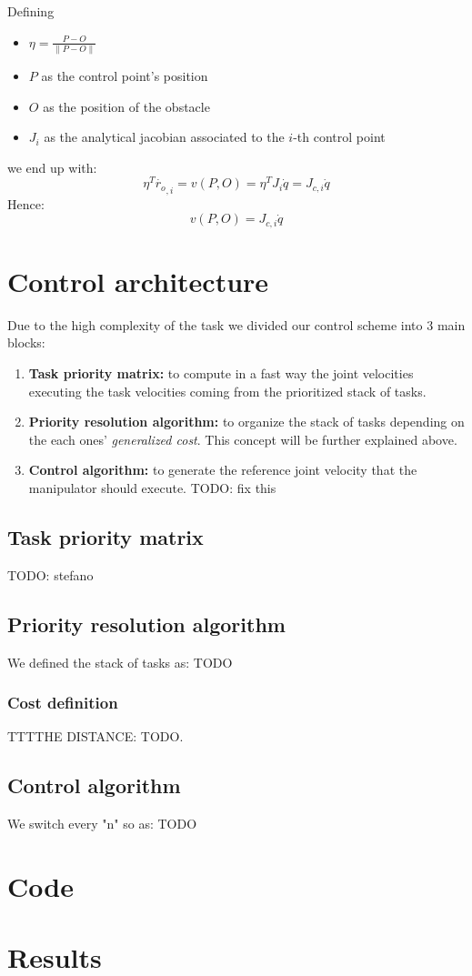 \documentclass[12pt,a4paper, twocolumn, twoside]{article}
\begin{document}
Defining 
\begin{itemize}
	\item $\eta = \frac{P - O}{\lVert P-O \rVert}$
	\item $P$ as the control point's position
	\item $O$ as the position of the obstacle
	\item $J_i$ as the analytical jacobian associated to the $i$-th control point
\end{itemize}
we end up with:
\begin{equation*}
\eta^T\dot{r_{o}}_{,i} = v(P,O) =\eta^T J_i\dot{q} = J_{c,i}\dot{q}
\end{equation*}
Hence:
\begin{equation}
v(P,O) = J_{c,i}\dot{q}
\end{equation}

\section{Control architecture}
Due to the high complexity of the task we divided our control scheme into 3 main blocks:
\begin{enumerate}
	\item \textbf{Task priority matrix:} to compute in a fast way the joint velocities executing the task velocities coming from the prioritized stack of tasks.
	\item \textbf{Priority resolution algorithm:} to organize the stack of tasks depending on the each ones' \textit{generalized cost}.
	This concept will be further explained above.
	\item \textbf{Control algorithm:} to generate the reference joint velocity that the manipulator should execute.
	TODO: fix this
\end{enumerate}

\subsection{Task priority matrix}
TODO: stefano
\subsection{Priority resolution algorithm}
We defined the stack of tasks as: TODO
\subsubsection{Cost definition}
TTTTHE DISTANCE: TODO.

\subsection{Control algorithm}
We switch every "n" so as: TODO
\section{Code}
\section{Results}
\tableofcontents
\end{document}

